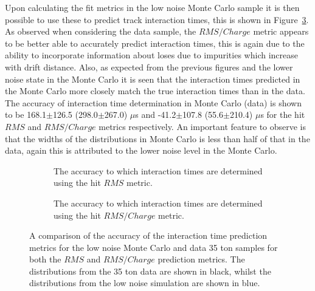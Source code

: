 Upon calculating the fit metrics in the low noise Monte Carlo sample it is then possible to use these to predict track interaction times, this is shown in Figure~\ref{fig:DiffMCDataRes}. As observed when considering the data sample, the $RMS/Charge$ metric appears to be better able to accurately predict interaction times, this is again due to the ability to incorporate information about loses due to impurities which increase with drift distance. Also, as expected from the previous figures and the lower noise state in the Monte Carlo it is seen that the interaction times predicted in the Monte Carlo more closely match the true interaction times than in the data. The accuracy of interaction time determination in Monte Carlo (data) is shown to be 168.1$\pm$126.5 (298.0$\pm$267.0) $\mu$s and -41.2$\pm$107.8 (55.6$\pm$210.4) $\mu$s for the hit $RMS$ and $RMS/Charge$ metrics respectively. An important feature to observe is that the widths of the distributions in Monte Carlo is less than half of that in the data, again this is attributed to the lower noise level in the Monte Carlo.

\begin{figure}[h!]
  \centering
    \begin{subfigure}{0.45\textwidth}
    \centering
    \caption{The accuracy to which interaction times are determined using the hit $RMS$ metric.}
    \label{fig:DiffMCDataResRMS}
  \end{subfigure}
  \hspace{0.08\textwidth}
  \begin{subfigure}{0.45\textwidth}
    \centering
    \caption{The accuracy to which interaction times are determined using the hit $RMS/Charge$ metric.}
    \label{fig:DiffMCDataResRMSQ}
  \end{subfigure}
  \caption[A comparison of the accuracy of the interaction time prediction metrics for the low noise Monte Carlo and data 35 ton samples]
          {A comparison of the accuracy of the interaction time prediction metrics for the low noise Monte Carlo and data 35 ton samples for both the $RMS$ and $RMS/Charge$ prediction metrics. The distributions from the 35 ton data are shown in black, whilst the distributions from the low noise simulation are shown in blue.}
          \label{fig:DiffMCDataRes}
\end{figure}

